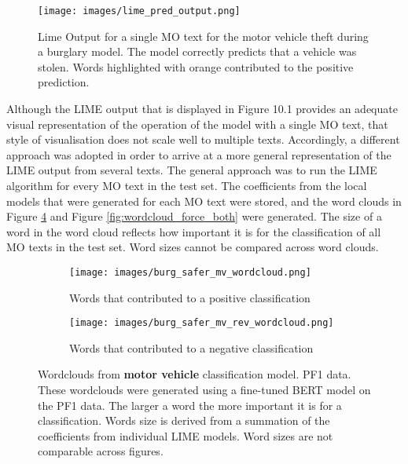 \begin{figure}[!tbp]
  \centering
    \texttt{[image: images/lime\_pred\_output.png]}
    \caption[Lime Output for a single MO text for the motor vehicle theft during a burglary model.]{ Lime Output for a single MO text for the motor vehicle theft during a burglary model. The model correctly predicts that a vehicle was stolen. Words highlighted with orange contributed to the positive prediction.}
    \label{fig:lime_out1}
\end{figure}



Although the LIME output that is displayed in Figure 10.1 provides an adequate visual representation of the operation of the model with a single MO text, that style of visualisation does not scale well to multiple texts. Accordingly, a different approach was adopted in order to arrive at a more general representation of the LIME output from several texts. The general approach was to run the LIME algorithm for every MO text in the test set. The coefficients from the local models that were generated for each MO text were stored, and the word clouds in Figure \ref{fig:wordcloud_mv_both}  and Figure \ref{fig:wordcloud_force_both} were generated. The size of a word in the word cloud reflects how important it is for the classification of all MO texts in the test set. Word sizes cannot be compared across word clouds.  



\begin{figure}
     \centering
     \begin{subfigure}[b]{0.9\textwidth}
         \centering
         \texttt{[image: images/burg\_safer\_mv\_wordcloud.png]}
         \caption{Words that contributed to a positive classification}
         \label{fig: wordcloud_mv}
     \end{subfigure}
     \vfill
     \begin{subfigure}[b]{0.9\textwidth}
         \centering
         \texttt{[image: images/burg\_safer\_mv\_rev\_wordcloud.png]}
         \caption{Words that contributed to a negative classification}
         \label{fig: wordcloud_mv_rev}
     \end{subfigure}
        \caption[Wordclouds from  \textbf{motor vehicle} classification model. PF1 data.]{Wordclouds from  \textbf{motor vehicle} classification model. PF1 data. These wordclouds were generated using a fine-tuned BERT model on the PF1 data. The larger a word the more important it is for a classification. Words size is derived from a summation of the coefficients from individual LIME models. Word sizes are not comparable across figures.}
        \label{fig:wordcloud_mv_both}
        
\end{figure}



